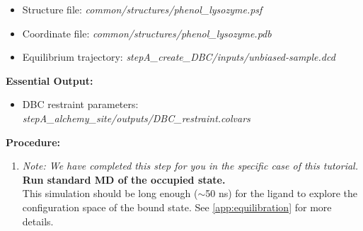 \documentclass[9pt,tutorial,pubversion]{Styling/livecoms}
\newcommand{\filepath}[1]{\textit{#1}}
\begin{document}
    \begin{itemize}
        \item Structure file: \filepath{common/structures/phenol\_lysozyme.psf} \item Coordinate file: \filepath{common/structures/phenol\_lysozyme.pdb}
        \item Equilibrium trajectory: \filepath{stepA\_create\_DBC/inputs/unbiased-sample.dcd}
    \end{itemize}
    \textbf{Essential Output:}
    \begin{itemize}
        \item DBC restraint parameters: \filepath{stepA\_alchemy\_site/outputs/DBC\_restraint.colvars}
    \end{itemize}
    \textbf{Procedure:}
    \begin{enumerate}
    \item \textit{Note: We have completed this step for you in the specific case of this tutorial.} \textbf{Run standard MD of the occupied state.}\label{step:unbiased}\\
    This simulation should be long enough ($\sim$50 ns) for the ligand to explore the configuration space of the bound state. See \ref{app:equilibration} for more details.
    

\end{enumerate}
\end{document}
